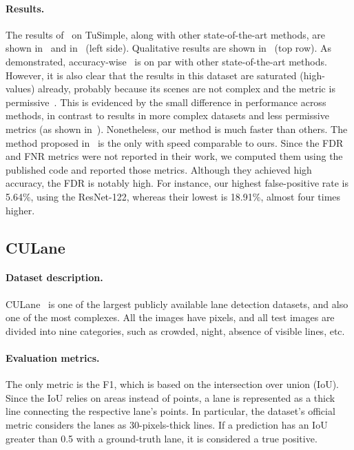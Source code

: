 \documentclass[final]{cvpr}
\begin{document}
\paragraph{Results.}



The results of \methodname~on TuSimple, along with other state-of-the-art methods, are shown in~ and in~ (left side). Qualitative results are shown in~ (top row). As demonstrated, accuracy-wise \methodname~is on par with other state-of-the-art methods. However, it is also clear that the results in this dataset are saturated (high-values) already, probably because its scenes are not complex and the metric is permissive~\cite{polylanenet}. This is evidenced by the small difference in performance across methods, in contrast to results in more complex datasets and less permissive metrics (as shown in~). Nonetheless, our method is much faster than others.
The method proposed in~\cite{ufsa} is the only with speed comparable to ours. Since the FDR and FNR metrics were not reported in their work, we computed them using the published code and reported those metrics. Although they achieved high accuracy, the FDR is notably high. For instance, our highest false-positive rate is 5.64\%, using the ResNet-122, whereas their lowest is 18.91\%, almost four times higher.

\subsection{CULane}
\label{sec:culane}
\paragraph{Dataset description.}
CULane~\cite{scnn} is one of the largest publicly available lane detection datasets, and also one of the most complexes. All the images have  pixels, and all test images are divided into nine categories, such as crowded, night, absence of visible lines, etc.

\paragraph{Evaluation metrics.}
The only metric is the F1, which is based on the intersection over union (IoU). Since the IoU relies on areas instead of points, a lane is represented as a thick line connecting the respective lane's points. In particular, the dataset’s official metric considers the lanes as 30-pixels-thick lines. If a prediction has an IoU greater than 0.5 with a ground-truth lane, it is considered a true positive.
\end{document}
